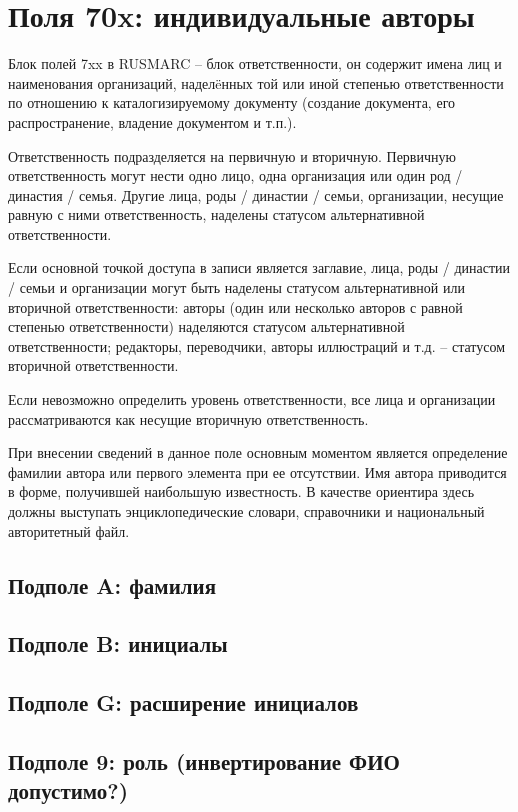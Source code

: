 \chapter{Поля 70x: индивидуальные авторы}

Блок полей 7xx в RUSMARC  -- блок ответственности, он содержит имена лиц и наименования организаций, надел\"eнных той или иной степенью ответственности по отношению к каталогизируемому документу (создание документа, его распространение, владение документом и т.п.).

Ответственность подразделяется на первичную и вторичную. Первичную ответственность могут нести одно лицо, одна организация или один род / династия / семья. Другие лица, роды / династии / семьи, организации, несущие равную с ними ответственность, наделены статусом альтернативной ответственности.

Если основной точкой доступа в записи является заглавие, лица, роды / династии / семьи и организации могут быть наделены статусом альтернативной или вторичной ответственности: авторы (один или несколько авторов с равной степенью ответственности) наделяются статусом альтернативной ответственности; редакторы, переводчики, авторы иллюстраций и т.д. -- статусом вторичной ответственности.

Если невозможно определить уровень ответственности, все лица и организации рассматриваются как несущие вторичную ответственность.

При внесении сведений в данное поле основным моментом является определение фамилии автора или первого элемента при ее отсутствии. Имя автора приводится в форме, получившей наибольшую известность. В качестве ориентира здесь должны выступать энциклопедические словари, справочники и национальный авторитетный файл.

\section{Подполе A: фамилия}

\section{Подполе B: инициалы}

\section{Подполе G: расширение инициалов}

\section{Подполе 9: роль (инвертирование ФИО допустимо?)}

